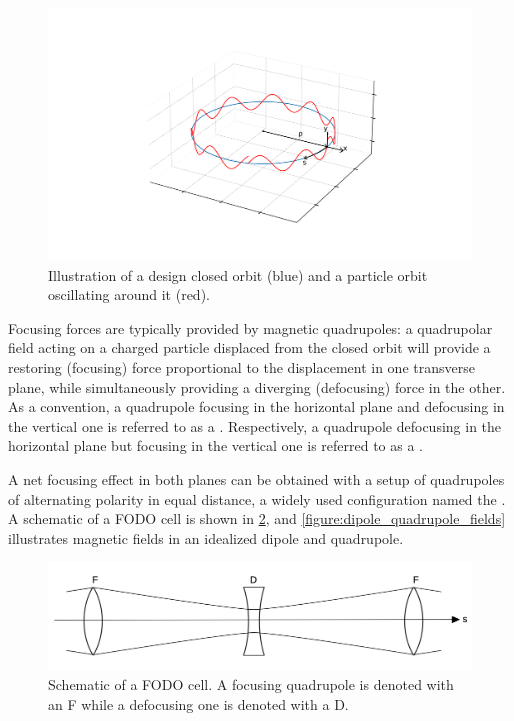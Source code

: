 \begin{figure}[!htb]
    \centering
    \includegraphics[width = 0.9\linewidth]{Figures/Beam_Dynamics_Theory/design_vs_particle_orbit.pdf}
    \caption{Illustration of a design closed orbit (blue) and a particle orbit oscillating around it (red).}
    \label{figure:design_vs_particle_orbit}
\end{figure}

Focusing forces are typically provided by magnetic quadrupoles: a quadrupolar field acting on a charged particle displaced from the closed orbit will provide a restoring (focusing) force proportional to the displacement in one transverse plane, while simultaneously providing a diverging (defocusing) force in the other. 
As a convention, a quadrupole focusing in the horizontal plane and defocusing in the vertical one is referred to as a . 
Respectively, a quadrupole defocusing in the horizontal plane but focusing in the vertical one is referred to as a .

A net focusing effect in both planes can be obtained with a setup of quadrupoles of alternating polarity in equal distance, a widely used configuration named the .
A schematic of a FODO cell is shown in \cref{figure:fodo_cell_schematic}, and \cref{figure:dipole_quadrupole_fields} illustrates magnetic fields in an idealized dipole and quadrupole.

\begin{figure}[!htb]
    \centering
    \includegraphics[width = 0.8\linewidth]{Figures/Beam_Dynamics_Theory/fodo_cell_schematic.png}
    \caption{Schematic of a FODO cell. A focusing quadrupole is denoted with an F while a defocusing one is denoted with a D.}
    \label{figure:fodo_cell_schematic}
\end{figure}

